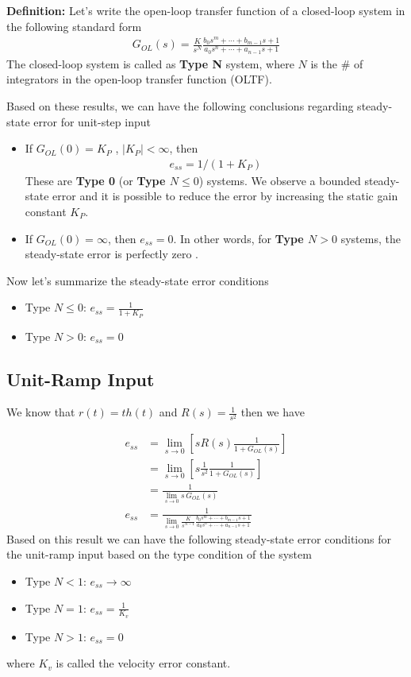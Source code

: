 \documentclass[twoside]{article}
\begin{document}
\textbf{Definition:} Let's write the open-loop transfer function of a closed-loop
system in the following standard form
%
\begin{align*}
G_{OL}(s) = \frac{K}{s^N} \frac{b_0 s^m + \cdots + b_{m-1} s + 1}{a_0 s^n + \cdots + a_{n-1} s + 1}
\end{align*}
%
The closed-loop system is called as \textbf{Type N} system, where
$N$ is the $\#$ of integrators in the open-loop transfer function (OLTF).

Based on these results, we can have the following conclusions
regarding steady-state error for unit-step input
%
\begin{itemize}
\item If $G_{OL} (0) = K_P$ , $| K_{P} | < \infty$, then 
\begin{align*}
e_{ss} =1/(1 + K_{P})
\end{align*}
% 
These are \textbf{Type 0} (or \textbf{Type $N \leq 0$})
systems. We observe a bounded steady-state error and it is possible to reduce the error by increasing the static gain
constant $K_P$. 
%
\item  If $G_{OL} (0) = \infty$, then $e_{ss} = 0$. In other words, for 
  \textbf{Type $N > 0$} systems, the steady-state error is perfectly zero .
\end{itemize}

Now let's summarize the steady-state error conditions
%
\begin{itemize}
\item Type $N \leq 0$: $e_{ss} =  \frac{1}{1 + K_{P}}$
\item Type $N > 0$: $e_{ss} = 0$
\end{itemize}

\subsection*{Unit-Ramp Input}
%
We know that $r(t) = t h(t)$ and $R(s) = \frac{1}{s^2}$ then
we have

\begin{align*}
e_{ss} &= \lim_{s \to 0} \left[ s R(s) \frac{1}{1
         + G_{OL} (s) } \right]
\\
&= \lim_{s \to 0} \left[ s \frac{1}{s^2} \frac{1}{1
         + G_{OL} (s) } \right]
\\
 &= \frac{1}{\lim_{s \to 0} s \, G_{OL} (s) }
\\
e_{ss} &= \frac{1}{\lim_{s \to 0} \frac{K}{s^{N-1}} \frac{b_0 s^m + \cdots + b_{m-1} s + 1}{a_0 s^n + \cdots + a_{n-1} s + 1} }
\end{align*}
%
Based on this result we can have the following steady-state
error conditions for the unit-ramp input based on the type 
condition of the system
%
\begin{itemize}
\item Type $N < 1$: $e_{ss} \to  \infty$
\item Type $N = 1$: $e_{ss} = \frac{1}{K_v}$
\item Type $N > 1$: $e_{ss} = 0$
\end{itemize}
%
where $K_v$ is called the velocity error constant.
 
\end{document}

